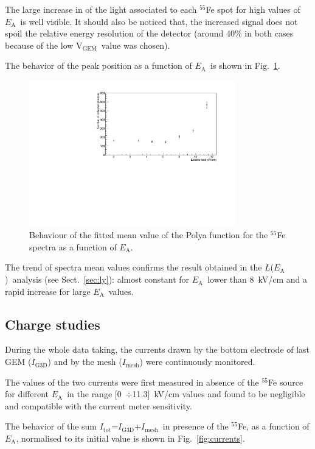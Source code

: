 \documentclass[a4paper,11pt]{article}
\newcommand{\Itot}{$I_{\mathrm{tot}}$}
\newcommand{\Ig}  {$I_{\mathrm{G3D}}$}
\newcommand{\Ime}  {$I_{\mathrm{mesh}}$}
\newcommand{\Ea}  {$E_{\mathrm{A}}$}
\newcommand{\La}  {$L$(\Ea)}
\newcommand{\Vg}  {V$_{\mathrm{GEM}}$}
\begin{document}
The large increase in of the light associated to each $^{55}$Fe spot for high values of \Ea\ is well visible. 
It should also be noticed that, the increased signal does not spoil the relative energy resolution of the detector (around 40\% in both cases because of the low \Vg\ value was chosen). 

The behavior of the peak position as a function of \Ea\ is shown in Fig.~\ref{fig:qIn2}.

\begin{figure}[ht]
\centering
\includegraphics[width=0.80\textwidth]{gqIn.pdf}
\caption{Behaviour of the fitted mean value of the Polya function for the
$^{55}$Fe spectra as a 
function of \Ea.} 
\label{fig:qIn2}
\end{figure}

The trend of spectra mean values confirms the result obtained in the \La\ analysis (see Sect.~\ref{sec:ly}): almost constant for \Ea\ lower than 8~kV/cm and a rapid increase for large \Ea\ values.

\subsection{Charge studies}

During the whole data taking, the currents drawn by the bottom electrode of last GEM (\Ig) and by the mesh (\Ime) were continuously monitored. 

The values of the two currents were first measured in absence of the $^{55}$Fe source for different \Ea\ in the range [0~$\div$11.3]~kV/cm values and found to be negligible and compatible with the current meter sensitivity.

The behavior of the sum \Itot=\Ig +\Ime\ in presence of the $^{55}$Fe, as a function of 
\Ea, normalised to its initial value is shown in Fig.~\ref{fig:currents}.
\end{document}
